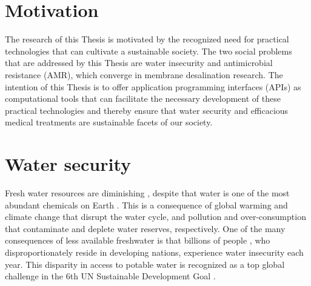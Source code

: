 
\section{Motivation}
The research of this Thesis is motivated by the recognized need for practical technologies that can cultivate a sustainable society. The two social problems that are addressed by this Thesis are water insecurity and antimicrobial resistance (AMR), which converge in membrane desalination research. The intention of this Thesis is to offer application programming interfaces (APIs) as computational tools that can facilitate the necessary development of these practical technologies and thereby ensure that water security and efficacious medical treatments are sustainable facets of our society.

\section{Water security}
Fresh water resources are diminishing \cite{Laghari2013MeltingUncertainty,Rasul2008GlobalRanges}, despite that water is one of the most abundant chemicals on Earth \cite{Shiklomanov1993WorldResources}. This is a consequence of global warming \cite{Hansen2006GlobalChange,IPCC2018Global1.5C} and climate change \cite{Thomas2004ExtinctionChange} that disrupt the water cycle, and pollution \cite{Pappas2017EnergySuperpower,Zhao2016DecouplingInvestment,Moller2010DistributionWatershed} and over-consumption \cite{Bongaarts2009HumanTransition,Meyer1992HumanChange} that contaminate and deplete water reserves, respectively. One of the many consequences of less available freshwater is that billions of people \cite{Unicef2017ThirstingClimate}, who disproportionately reside in developing nations, experience water insecurity each year\cite{Hoekstra2012GlobalAvailability}. This disparity in access to potable water is recognized as a top global challenge in the 6th UN Sustainable Development Goal \cite{Jones2018TheOutlook}. 

